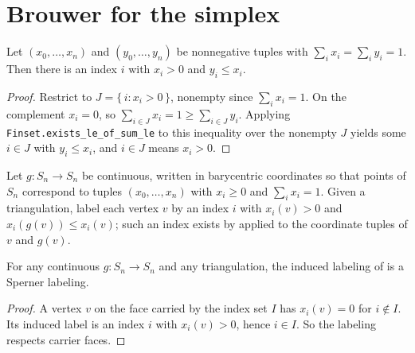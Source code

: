 \section{Brouwer for the simplex}

\begin{lemma}
    \label{lem:label-pigeonhole}
    \leanok
    Let $(x_0, \dots, x_n)$ and $(y_0, \dots, y_n)$ be nonnegative tuples with
    $\sum_i x_i = \sum_i y_i = 1$. Then there is an index $i$ with $x_i > 0$ and
    $y_i \le x_i$.
\end{lemma}
\begin{proof}
    Restrict to $J = \{\, i : x_i > 0 \,\}$, nonempty since $\sum_i x_i = 1$. On
    the complement $x_i = 0$, so $\sum_{i \in J} x_i = 1 \ge \sum_{i \in J} y_i$.
    Applying \texttt{Finset.exists\_le\_of\_sum\_le} to this inequality over the
    nonempty $J$ yields some $i \in J$ with $y_i \le x_i$, and $i \in J$ means
    $x_i > 0$.
\end{proof}

\begin{definition}
    \label{def:induced-labeling}
    \leanok
    Let $g : S_n \to S_n$ be continuous, written in barycentric coordinates so
    that points of $S_n$ correspond to tuples $(x_0, \dots, x_n)$ with
    $x_i \ge 0$ and $\sum_i x_i = 1$. Given a triangulation, label each vertex
    $v$ by an index $i$ with $x_i(v) > 0$ and $x_i(g(v)) \le x_i(v)$; such an
    index exists by  applied to the coordinate tuples
    of $v$ and $g(v)$.
\end{definition}

\begin{lemma}
    \label{lem:induced-is-sperner}
    For any continuous $g : S_n \to S_n$ and any triangulation, the induced
    labeling of  is a Sperner labeling.
\end{lemma}
\begin{proof}
    A vertex $v$ on the face carried by the index set $I$ has $x_i(v) = 0$ for
    $i \notin I$. Its induced label is an index $i$ with $x_i(v) > 0$, hence
    $i \in I$. So the labeling respects carrier faces.
\end{proof}

